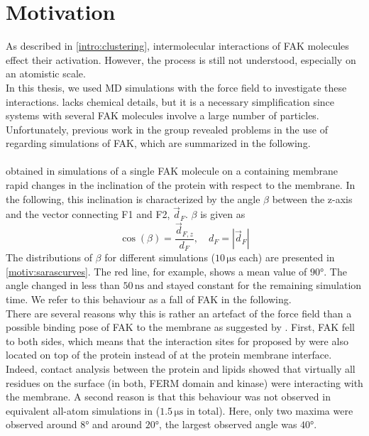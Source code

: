 \chapter{Motivation}
\label{motivation}
As described in \autoref{intro:clustering}, intermolecular interactions of FAK molecules effect their activation. However, the process is still not understood, especially on an atomistic scale.\\
In this thesis, we used MD simulations with the \martini{} force field to investigate these interactions. \martini{} lacks chemical details, but it is a necessary simplification since systems with several FAK molecules involve a large number of particles. Unfortunately, previous work in the group \autocite{sara} revealed problems in the use of \martini{} regarding simulations of FAK, which are summarized in the following.\\
\\
\textcite{sara} obtained in simulations of a single FAK molecule on a \pip{} containing membrane rapid changes in the inclination of the protein with respect to the membrane. In the following, this inclination is characterized by the angle $\beta$ between the z-axis and the vector connecting F1 and F2, $\vec{d}_F$. $\beta$ is given as
\begin{equation}
\cos\left(\beta\right) = \frac{\vec{d}_{F, z}}{d_F},\quad d_F = \left|\vec{d}_F\right|
\end{equation}
The distributions of $\beta$ for different simulations ($10\,\si{\micro\second}$ each) are presented in \autoref{motiv:sarascurves}. The red line, for example, shows a mean value of $90°$. The angle changed in less than $50\,\si{\nano\second}$ and stayed constant for the remaining simulation time. We refer to this behaviour as a fall of FAK in the following.\\
There are several reasons why this is rather an artefact of the \martini{} force field than a possible binding pose of FAK to the membrane as suggested by \textcite{pap002}. First, FAK fell to both sides, which means that the interaction sites for \pip{} proposed by \textcite{pap002} were also located on top of the protein instead of at the protein membrane interface. Indeed, contact analysis between the protein and \pip{} lipids showed that virtually all residues on the surface (in both, FERM domain and kinase) were interacting with the membrane. A second reason is that this behaviour was not observed in equivalent all-atom simulations in \charmm{} ($1.5\,\si{\micro\second}$ in total). Here, only two maxima were observed around $8°$ and around $20°$, the largest observed angle was $40°$.\\
